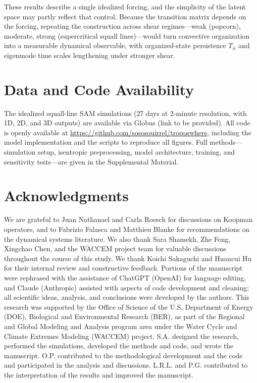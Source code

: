 \documentclass[
    aps,
    prl,
    reprint,
    superscriptaddress,
    amsmath,amssymb,
    floatfix,
    nofootinbib
]{revtex4-2}
\begin{document}
These results describe a single idealized forcing, and the simplicity of the latent space may partly reflect that control. Because the transition matrix depends on the forcing, repeating the construction across shear regimes---weak (popcorn), moderate, strong (supercritical squall lines)---would turn convective organization into a measurable dynamical observable, with organized-state persistence $T_{ii}$ and eigenmode time scales lengthening under stronger shear.

\section*{Data and Code Availability}

The idealized squall-line SAM simulations (27 days at 2-minute resolution, with 1D, 2D, and 3D outputs) are available via Globus (link to be provided). All code is openly available at \url{https://github.com/sososquirrel/troposwhere}, including the model implementation and the scripts to reproduce all figures. Full methods---simulation setup, isentropic preprocessing, model architecture, training, and sensitivity tests---are given in the Supplemental Material.

\section*{Acknowledgments}

We are grateful to Juan Nathanael and Carla Roesch for discussions on Koopman operators, and to Fabrizio Falasca and Matthieu Blanke for recommendations on the dynamical systems literature. We also thank Sara Shamekh, Zhe Feng, Xingchao Chen, and the WACCEM project team for valuable discussions throughout the course of this study. We thank Koichi Sakaguchi and Huancui Hu for their internal review and constructive feedback. Portions of the manuscript were rephrased with the assistance of ChatGPT (OpenAI) for language editing, and Claude (Anthropic) assisted with aspects of code development and cleaning; all scientific ideas, analysis, and conclusions were developed by the authors. This research was supported by the Office of Science of the U.S. Department of Energy (DOE), Biological and Environmental Research (BER), as part of the Regional and Global Modeling and Analysis program area under the Water Cycle and Climate Extremes Modeling (WACCEM) project. S.A. designed the research, performed the simulations, developed the methods and code, and wrote the manuscript. O.P. contributed to the methodological development and the code and participated in the analysis and discussions. L.R.L. and P.G. contributed to the interpretation of the results and improved the manuscript.



\end{document}
